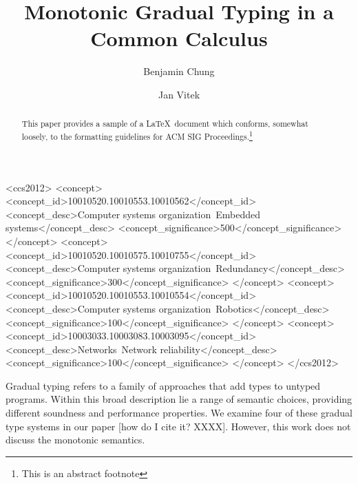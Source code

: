 \documentclass[sigconf]{acmart}
\begin{document}
\title{Monotonic Gradual Typing in a Common Calculus}
\subtitle{}

\author{Benjamin Chung}

\author{Jan Vitek}


\begin{abstract}
This paper provides a sample of a \LaTeX\ document which conforms,
somewhat loosely, to the formatting guidelines for
ACM SIG Proceedings.\footnote{This is an abstract footnote}
\end{abstract}

%
%
\begin{CCSXML}
<ccs2012>
 <concept>
  <concept_id>10010520.10010553.10010562</concept_id>
  <concept_desc>Computer systems organization~Embedded systems</concept_desc>
  <concept_significance>500</concept_significance>
 </concept>
 <concept>
  <concept_id>10010520.10010575.10010755</concept_id>
  <concept_desc>Computer systems organization~Redundancy</concept_desc>
  <concept_significance>300</concept_significance>
 </concept>
 <concept>
  <concept_id>10010520.10010553.10010554</concept_id>
  <concept_desc>Computer systems organization~Robotics</concept_desc>
  <concept_significance>100</concept_significance>
 </concept>
 <concept>
  <concept_id>10003033.10003083.10003095</concept_id>
  <concept_desc>Networks~Network reliability</concept_desc>
  <concept_significance>100</concept_significance>
 </concept>
</ccs2012>
\end{CCSXML}





\maketitle

Gradual typing refers to a family of approaches that add types to untyped
programs. Within this broad description lie a range of semantic choices,
providing different soundness and performance properties. We examine four of
these gradual type systems in our paper [how do I cite it? XXXX]. However,
this work does not discuss the monotonic semantics.
\end{document}
